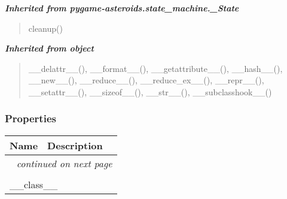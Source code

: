 \large{\textbf{\textit{Inherited from pygame-asteroids.state\_machine.\_State}}}

\begin{quote}
cleanup()
\end{quote}

\large{\textbf{\textit{Inherited from object}}}

\begin{quote}
\_\_delattr\_\_(), \_\_format\_\_(), \_\_getattribute\_\_(), \_\_hash\_\_(), \_\_new\_\_(), \_\_reduce\_\_(), \_\_reduce\_ex\_\_(), \_\_repr\_\_(), \_\_setattr\_\_(), \_\_sizeof\_\_(), \_\_str\_\_(), \_\_subclasshook\_\_()
\end{quote}


  \subsubsection{Properties}

    \vspace{-1cm}
\hspace{\varindent}\begin{longtable}{|p{\varnamewidth}|p{\vardescrwidth}|l}
\cline{1-2}
\cline{1-2} \centering \textbf{Name} & \centering \textbf{Description}& \\
\cline{1-2}
\endhead\cline{1-2}\multicolumn{3}{r}{\small\textit{continued on next page}}\\\endfoot\cline{1-2}
\endlastfoot\multicolumn{2}{|l|}{\textit{Inherited from object}}\\
\multicolumn{2}{|p{\varwidth}|}{\raggedright \_\_class\_\_}\\
\cline{1-2}
\end{longtable}

